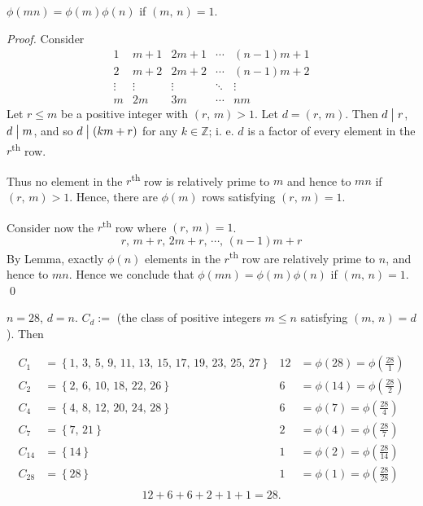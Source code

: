 \begin{theorem}
    $\phi\left(mn\right)=\phi\left(m\right)\phi\left(n\right)$ if $\left(m,\,n\right)=1$.
\end{theorem}
\begin{proof}
    Consider
    \begingroup
    \setlength{\arraycolsep}{10pt}
    \[
        \begin{matrix}
            1 & m+1 & 2m+1 & \cdots & \left(n-1\right)m+1 \\
            2 & m+2 & 2m+2 & \cdots & \left(n-1\right)m+2 \\
            \vdots & \vdots & \vdots & \ddots & \vdots \\
            m & 2m & 3m & \cdots & nm
        \end{matrix}
    \]
    \endgroup
    Let $r \leq m$ be a positive integer with $\left(r,\,m\right)>1$. Let $d=\left(r,\,m\right)$.
    Then $d\bigm| r$, $d\bigm| m$, and so $d \bigm| \left(km+r\right)$ for any $k \in \mathbb{Z}$;
    i. e. $d$ is a factor of every element in the $r$\textsuperscript{th} row.

    Thus no element in the $r$\textsuperscript{th} row is relatively prime to $m$ and hence
    to $mn$ if $\left(r,\,m\right)>1$. Hence, there are $\phi\left(m\right)$ rows
    satisfying $\left(r,\,m\right)=1$.

    Consider now the $r$\textsuperscript{th} row where $\left(r,\,m\right)=1$.
    \[
        r,\,m+r,\,2m+r,\,\cdots,\,\left(n-1\right)m+r
    \]
    By Lemma, exactly $\phi\left(n\right)$ elements in the $r$\textsuperscript{th}
    row are relatively prime to $n$, and hence to $mn$.
    Hence we conclude that $\phi\left(mn\right)=\phi\left(m\right)\phi\left(n\right)$ if $\left(m,\,n\right)=1$.
    \qed
\end{proof}

\begin{note}
    $n=28$, $d=n$. $C_d :=$ (the class of positive integers $m \leq n$ satisfying $\left(m,\,n\right)=d$). Then

    \begin{align*}
        C_1 &= \left\{1,\,3,\,5,\,9,\,11,\,13,\,15,\,17,\,19,\,23,\,25,\,27\right\} & 12&=\phi\left(28\right)=\phi\left(\frac{28}{1}\right) \\
        C_2 &= \left\{2,\,6,\,10,\,18,\,22,\,26\right\} & 6&=\phi\left(14\right)=\phi\left(\frac{28}{2}\right) \\
        C_4 &= \left\{4,\,8,\,12,\,20,\,24,\,28\right\} & 6&=\phi\left(7\right)=\phi\left(\frac{28}{4}\right) \\
        C_7 &= \left\{7,\,21\right\} & 2&=\phi\left(4\right)=\phi\left(\frac{28}{7}\right) \\
        C_{14} &= \left\{14\right\} & 1&=\phi\left(2\right)=\phi\left(\frac{28}{14}\right) \\
        C_{28} &= \left\{28\right\} & 1&=\phi\left(1\right)=\phi\left(\frac{28}{28}\right) \\
    \end{align*}
    \[
        12+6+6+2+1+1=28.
    \]
\end{note}

